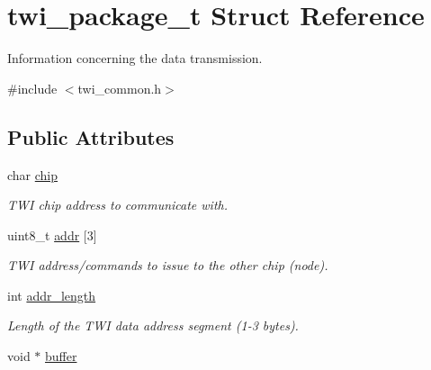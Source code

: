 \hypertarget{structtwi__package__t}{\section{twi\-\_\-package\-\_\-t Struct Reference}
\label{structtwi__package__t}
}


Information concerning the data transmission.  




{\ttfamily \#include $<$twi\-\_\-common.\-h$>$}

\subsection*{Public Attributes}
\begin{DoxyCompactItemize}
\item 
\hypertarget{structtwi__package__t_a8362042f96dd363b28ab684c8c2ffcf0}{char \hyperlink{structtwi__package__t_a8362042f96dd363b28ab684c8c2ffcf0}{chip}}\label{structtwi__package__t_a8362042f96dd363b28ab684c8c2ffcf0}

\begin{DoxyCompactList}\small\item\em T\-W\-I chip address to communicate with. \end{DoxyCompactList}\item 
\hypertarget{structtwi__package__t_aa264e69f3689bc96cc9232d9be76f7b1}{uint8\-\_\-t \hyperlink{structtwi__package__t_aa264e69f3689bc96cc9232d9be76f7b1}{addr} \mbox{[}3\mbox{]}}\label{structtwi__package__t_aa264e69f3689bc96cc9232d9be76f7b1}

\begin{DoxyCompactList}\small\item\em T\-W\-I address/commands to issue to the other chip (node). \end{DoxyCompactList}\item 
\hypertarget{structtwi__package__t_a397e982e6fa809c3fb834309537ffdbd}{int \hyperlink{structtwi__package__t_a397e982e6fa809c3fb834309537ffdbd}{addr\-\_\-length}}\label{structtwi__package__t_a397e982e6fa809c3fb834309537ffdbd}

\begin{DoxyCompactList}\small\item\em Length of the T\-W\-I data address segment (1-\/3 bytes). \end{DoxyCompactList}\item 
\hypertarget{structtwi__package__t_aeb2581a307406556e0246e1e7b7ed0b4}{void $\ast$ \hyperlink{structtwi__package__t_aeb2581a307406556e0246e1e7b7ed0b4}{buffer}}\label{structtwi__package__t_aeb2581a307406556e0246e1e7b7ed0b4}


\end{DoxyCompactItemize}

